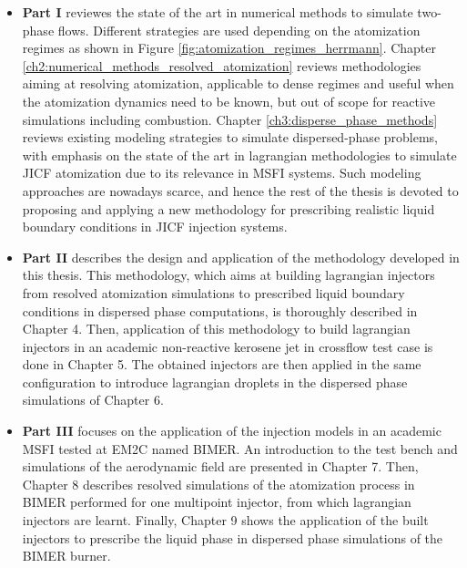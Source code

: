 \begin{itemize}

	\item \textbf{Part I} reviewes the state of the art in numerical methods to simulate two-phase flows. Different strategies are used depending on the atomization regimes as shown in Figure \ref{fig:atomization_regimes_herrmann}. Chapter \ref{ch2:numerical_methods_resolved_atomization} reviews methodologies aiming at resolving atomization, applicable to dense regimes and useful when the atomization dynamics need to be known, but out of scope for reactive simulations including combustion. Chapter \ref{ch3:disperse_phase_methods} reviews existing modeling strategies to simulate dispersed-phase problems, with emphasis on the state of the art in lagrangian 	methodologies to simulate JICF atomization due to its relevance in MSFI systems. Such modeling approaches are nowadays scarce, and hence the rest of the thesis is devoted to proposing and applying a new methodology for prescribing realistic liquid boundary conditions in JICF injection systems.
	
	\item \textbf{Part II} describes the design and application of the methodology developed in this thesis. This methodology, which aims at building lagrangian injectors from resolved atomization simulations to prescribed liquid boundary conditions in dispersed phase computations, is thoroughly described in Chapter 4. Then, application of this methodology to build lagrangian injectors in an academic non-reactive kerosene jet in crossflow test case is done in Chapter 5. The obtained injectors are then applied in the same configuration to introduce lagrangian droplets in the dispersed phase simulations of Chapter 6.
	
	\item \textbf{Part III} focuses on the application of the injection models in an academic MSFI tested at EM2C named BIMER. An introduction to the test bench and simulations of the aerodynamic field are presented in Chapter 7. Then, Chapter 8 describes resolved simulations of the atomization process in BIMER performed for one multipoint injector, from which lagrangian injectors are learnt. Finally, Chapter 9 shows the application of the built injectors to prescribe the liquid phase in dispersed phase simulations of the BIMER burner.


\end{itemize}
